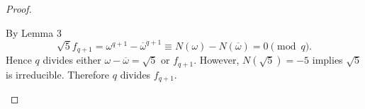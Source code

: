 \documentclass[10pt]{amsart}
\begin{document}
\begin{thm}
\begin{proof}
\begin{enumerate}[(a)]
      By Lemma 3 
      $$\sqrt{5}f_{q+1} = \omega^{q+1} - \overline{\omega}^{q+1} \equiv N(\omega) - N(\overline{\omega}) = 0 \pmod{q}.$$
      Hence $q$ divides either $\omega - \overline{\omega} = \sqrt{5}$ or $f_{q+1}$.
      However, $N(\sqrt{5}) = -5$ implies $\sqrt{5}$ is irreducible.
      Therefore $q$ divides $f_{q+1}$.
    \end{enumerate}
  \end{proof}
\end{thm}
\end{document}
